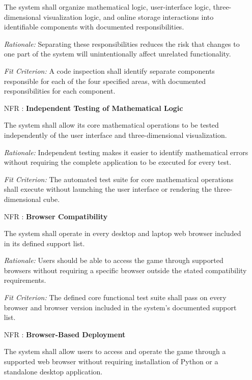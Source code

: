 \documentclass[12pt]{article}
\newcounter{nfrnum} %
\begin{document}
\begin{itemize}
The system shall organize mathematical logic, user-interface
logic, three-dimensional visualization logic, and online
storage interactions into identifiable components with
documented responsibilities.

\textit{Rationale:} Separating these responsibilities reduces
the risk that changes to one part of the system will
unintentionally affect unrelated functionality.

\textit{Fit Criterion:} A code inspection shall identify
separate components responsible for each of the four specified
areas, with documented responsibilities for each component.


\item[NFR\refstepcounter{nfrnum}\thenfrnum
\label{NFR_8}:]
\textbf{Independent Testing of Mathematical Logic}

The system shall allow its core mathematical operations to
be tested independently of the user interface and three-dimensional
visualization.

\textit{Rationale:} Independent testing makes it easier to
identify mathematical errors without requiring the complete
application to be executed for every test.

\textit{Fit Criterion:} The automated test suite for core
mathematical operations shall execute without launching the
user interface or rendering the three-dimensional cube.



\item[NFR\refstepcounter{nfrnum}\thenfrnum
\label{NFR_9}:]
\textbf{Browser Compatibility}

The system shall operate in every desktop and laptop web
browser included in its defined support list.

\textit{Rationale:} Users should be able to access the game
through supported browsers without requiring a specific
browser outside the stated compatibility requirements.

\textit{Fit Criterion:} The defined core functional test suite
shall pass on every browser and browser version included in
the system's documented support list.


\item[NFR\refstepcounter{nfrnum}\thenfrnum
\label{NFR_10}:]
\textbf{Browser-Based Deployment}

The system shall allow users to access and operate the game
through a supported web browser without requiring installation
of Python or a standalone desktop application.


\end{itemize}
\end{document}
